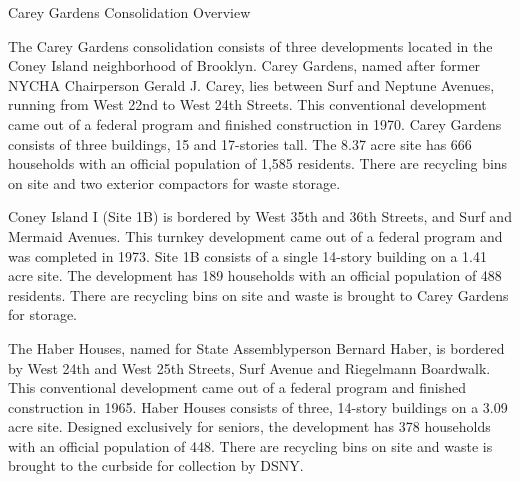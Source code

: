 Carey Gardens Consolidation Overview

The Carey Gardens consolidation consists of three developments located in the Coney Island neighborhood of Brooklyn. Carey Gardens, named after former NYCHA Chairperson Gerald J. Carey, lies between Surf and Neptune Avenues, running from West 22nd to West 24th Streets. This conventional development came out of a federal program and finished construction in 1970. Carey Gardens consists of three buildings, 15 and 17-stories tall. The 8.37 acre site has 666 households with an official population of 1,585 residents. There are recycling bins on site and two exterior compactors for waste storage.

Coney Island I (Site 1B) is bordered by West 35th and 36th Streets, and Surf and Mermaid Avenues. This turnkey development came out of a federal program and was completed in 1973. Site 1B consists of a single 14-story building on a 1.41 acre site. The development has 189 households with an official population of 488 residents. There are recycling bins on site and waste is brought to Carey Gardens for storage.

The Haber Houses, named for State Assemblyperson Bernard Haber, is bordered by West 24th and West 25th Streets, Surf Avenue and Riegelmann Boardwalk. This conventional development came out of a federal program and finished construction in 1965. Haber Houses consists of three, 14-story buildings on a 3.09 acre site. Designed exclusively for seniors, the development has 378 households with an official population of 448. There are recycling bins on site and waste is brought to the curbside for collection by DSNY.
